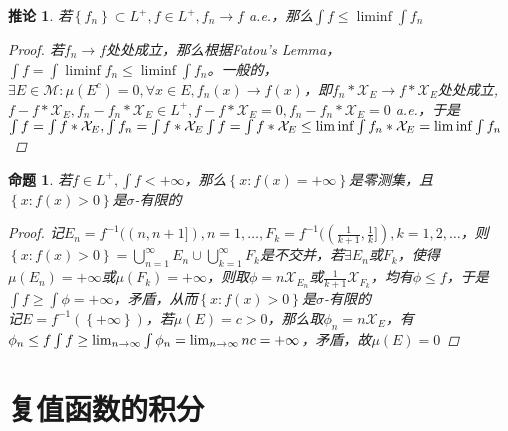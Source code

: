 \documentclass[12pt, a4paper, oneside]{ctexbook}
\newtheorem{corollary}[theorem]{推论}
\newtheorem{proposition}[theorem]{命题}
\begin{document}
\begin{corollary}
    若$\left\{f_n\right\}\subset L^+,f\in L^+,f_n\to f$ a.e.，那么$\int f\leq \liminf\int f_n$
    \begin{proof}
        若$f_n\to f$处处成立，那么根据Fatou's Lemma，$\int f=\int \liminf f_n\leq
        \liminf \int f_n$。一般的，$\exists E\in\mathcal{M}:\mu(E^c)=0,\forall x\in E,f_n(x)\to f(x)$，即$f_n*
        \mathcal{X}_E\to f*\mathcal{X}_E$处处成立,$f-f*\mathcal{X}_E,f_n-f_n*\mathcal{X}_E\in L^+,f-f*\mathcal{X}_E=0,f_n-
        f_n*\mathcal{X}_E=0$ a.e.，于是$\int f=\int f*\mathcal{X}_E,\int f_n=\int f*\mathcal{X}_E\\
        \int f=\int f*\mathcal{X}_E\leq \liminf \int f_n*\mathcal{X}_E=\liminf \int f_n$
    \end{proof}
\end{corollary}
\begin{proposition}
    若$f\in L^+,\int f<+\infty$，那么$\left\{x:f(x)=+\infty\right\}$是零测集，且
    $\left\{x:f(x)>0\right\}$是$\sigma$-有限的
    \begin{proof}
        记$E_n=f^{-1}((n,n+1]),n=1,\dots,F_k=f^{-1}((\frac{1}{k+1},\frac{1}{k}]),k=1,2,\dots
        $，则$\left\{x:f(x)>0\right\}=\bigcup_{n=1}^{\infty}E_n\cup\bigcup_{k=1}^{\infty}F_k$是不交并，若$\exists E_n$或$F_k$，使得$\mu(E_n)=
        +\infty$或$\mu(F_k)=+\infty$，则取$\phi=n\mathcal{X}_{E_n}$或$\frac{1}{k+1}\mathcal{X}_{F_k}$，均有$\phi\leq f$，于是$\int f\geq
        \int \phi=+\infty$，矛盾，从而$\left\{x:f(x)>0\right\}$是$\sigma$-有限的\\
        记$E=f^{-1}(\left\{+\infty\right\})$，若$\mu(E)=c>0$，那么取$\phi_n=n\mathcal{X}_E$，有$\phi_n\leq f\\
        \int f\geq\lim_{n\to\infty}\int \phi_n=\lim_{n\to\infty}nc=+\infty$，矛盾，故$\mu(E)=0$
    \end{proof}
\end{proposition}

\section{复值函数的积分}
\end{document}
